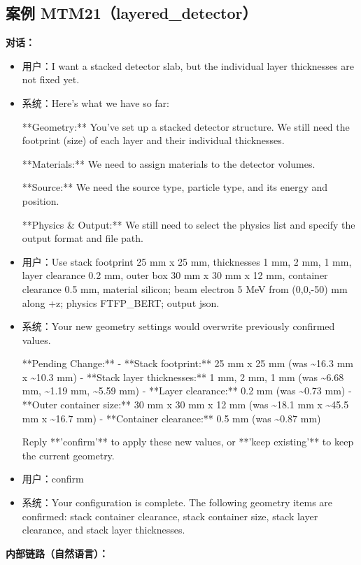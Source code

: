 \documentclass[11pt]{ctexart}
\begin{document}
\subsection{案例 MTM21（layered\_detector）}
\textbf{对话：}
\begin{itemize}
\item 用户：I want a stacked detector slab, but the individual layer thicknesses are not fixed yet.
\item 系统：Here's what we have so far:

**Geometry:** You've set up a stacked detector structure. We still need the footprint (size) of each layer and their individual thicknesses.

**Materials:** We need to assign materials to the detector volumes.

**Source:** We need the source type, particle type, and its energy and position.

**Physics \& Output:** We still need to select the physics list and specify the output format and file path.
\item 用户：Use stack footprint 25 mm x 25 mm, thicknesses 1 mm, 2 mm, 1 mm, layer clearance 0.2 mm, outer box 30 mm x 30 mm x 12 mm, container clearance 0.5 mm, material silicon; beam electron 5 MeV from (0,0,-50) mm along +z; physics FTFP\_BERT; output json.
\item 系统：Your new geometry settings would overwrite previously confirmed values.

**Pending Change:**
- **Stack footprint:** 25 mm x 25 mm (was \textasciitilde{}16.3 mm x \textasciitilde{}10.3 mm)
- **Stack layer thicknesses:** 1 mm, 2 mm, 1 mm (was \textasciitilde{}6.68 mm, \textasciitilde{}1.19 mm, \textasciitilde{}5.59 mm)
- **Layer clearance:** 0.2 mm (was \textasciitilde{}0.73 mm)
- **Outer container size:** 30 mm x 30 mm x 12 mm (was \textasciitilde{}18.1 mm x \textasciitilde{}45.5 mm x \textasciitilde{}16.7 mm)
- **Container clearance:** 0.5 mm (was \textasciitilde{}0.87 mm)

Reply **'confirm'** to apply these new values, or **'keep existing'** to keep the current geometry.
\item 用户：confirm
\item 系统：Your configuration is complete. The following geometry items are confirmed: stack container clearance, stack container size, stack layer clearance, and stack layer thicknesses.
\end{itemize}
\textbf{内部链路（自然语言）：}
\end{document}
